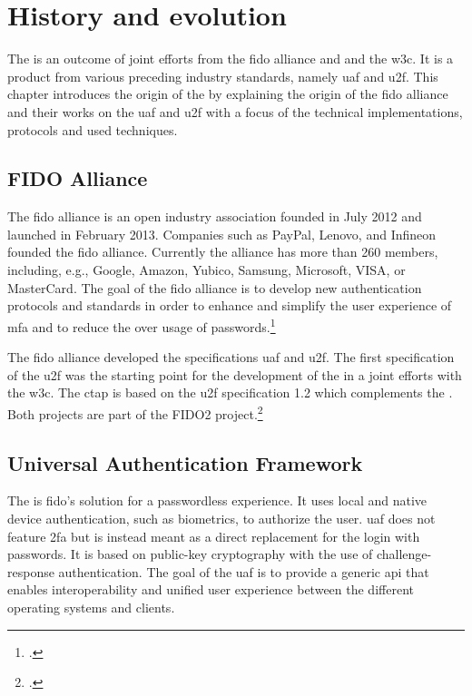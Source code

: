 
\section{History and evolution}

The \wa{} is an outcome of joint efforts from the \gls{fido} alliance and and the \gls{w3c}. It is a product from various preceding industry standards, namely \gls{uaf} and \gls{u2f}. This chapter introduces the origin of the \wa{} by explaining the origin of the \gls{fido} alliance and their works on the \gls{uaf} and \gls{u2f} with a focus of the technical implementations, protocols and used techniques.

\subsection{FIDO Alliance}

The \gls{fido} alliance is an open industry association founded in July 2012 and launched in February 2013. Companies such as PayPal, Lenovo, and Infineon founded the \gls{fido} alliance. Currently the alliance has more than 260 members, including, e.g., Google, Amazon, Yubico, Samsung, Microsoft, VISA, or MasterCard. The goal of the \gls{fido} alliance is to develop new authentication protocols and standards in order to enhance and simplify the user experience of \gls{mfa} and to reduce the over usage of passwords.\footcites[See][583]{eckert-it-sec-9}

The \gls{fido} alliance developed the specifications \gls{uaf} and \gls{u2f}. The first specification of the \gls{u2f} was the starting point for the development of the \wa{} in a joint efforts with the \gls{w3c}. The \gls{ctap} is based on the \gls{u2f} specification 1.2 which complements the \wa. Both projects are part of the FIDO2 project.\footcite[See][169--170]{grimes2017hacking}

\subsection{Universal Authentication Framework}

The  is \gls{fido}'s solution for a passwordless experience. It uses local and native device authentication, such as biometrics, to authorize the user. \gls{uaf} does not feature \gls{2fa} but is instead meant as a direct replacement for the login with passwords. It is based on public-key cryptography with the use of challenge-response authentication. The goal of the \gls{uaf} is to provide a generic \gls{api} that enables interoperability and unified user experience between the different operating systems and clients.

